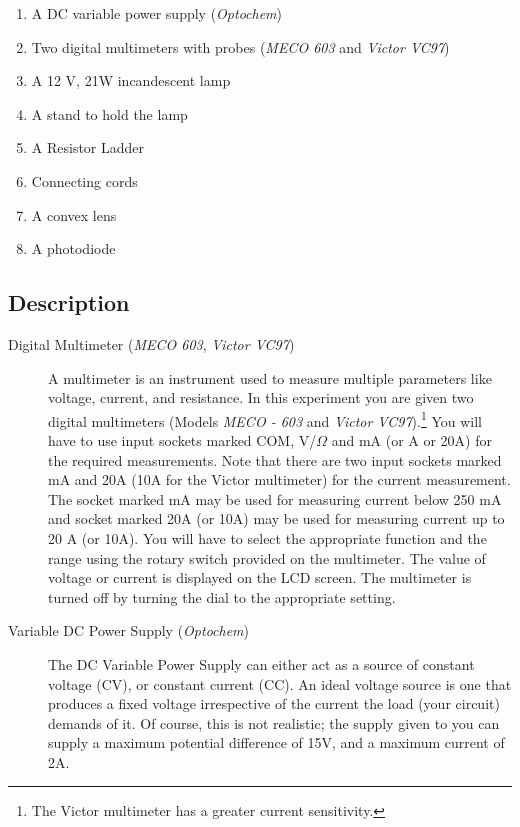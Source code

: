 \begin{refsection}
\begin{enumerate}
\item A DC variable power supply (\textit{Optochem})
\item Two digital multimeters with probes (\textit{MECO 603} and \textit{Victor VC97})
\item A 12 V, 21W incandescent lamp
\item A stand to hold the lamp
\item A Resistor Ladder
\item Connecting cords
\item A convex lens
\item A photodiode

\end{enumerate}


\subsection*{Description}

\begin{description}
\item[Digital Multimeter (\textit{MECO 603}, \textit{Victor VC97})]

A multimeter is an instrument used to measure multiple parameters like voltage, current, and resistance. In this experiment you are given two digital multimeters (Models \textit{MECO - 603} and \textit{Victor VC97}).\footnote{The Victor multimeter has a greater current sensitivity.} You will have to use input sockets marked COM, V/$\Omega$ and mA (or A or 20A) for the required measurements. Note that there are two input sockets marked mA and 20A (10A for the Victor multimeter) for the current measurement. The socket marked mA may be used for measuring current below 250 mA and socket marked 20A (or 10A) may be used for measuring current up to 20 A (or 10A). You will have to select the appropriate function and the range using the rotary switch provided on the multimeter. The value of voltage or current is displayed on the LCD screen. The multimeter is turned off by turning the dial to the appropriate setting.

\item[Variable DC Power Supply (\textit{Optochem})]

The DC Variable Power Supply can either act as a source of constant voltage (CV), or constant current (CC). An ideal voltage source is one that produces a fixed voltage irrespective of the current the load (your circuit) demands of it. Of course, this is not realistic; the supply given to you can supply a maximum potential difference of 15V, and a maximum current of 2A.


\end{description}
\end{refsection}
